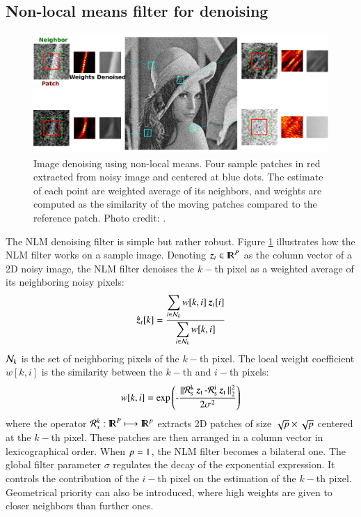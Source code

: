 \subsection{Non-local means filter for denoising}
\begin{figure}
	\centering
	\includegraphics[width=\columnwidth]{./images/NLM/lena.png}		
	\caption{\label{fig:lena} Image denoising using non-local means. Four sample patches in red extracted from noisy image and centered at blue dots. The estimate of each point are weighted average of its neighbors, and weights are computed as the similarity of the moving patches compared to the reference patch. Photo credit: \citet{foi2016foveated}.}
\end{figure}

The NLM denoising filter is simple but rather robust. Figure \ref{fig:lena} illustrates how the NLM filter works on a sample image. Denoting $ \operatorname{\boldsymbol{z}}_t \in {\rm I\!R}^{P} $ as the column vector of a 2D noisy image, the NLM filter denoises the $ k- $th pixel as a weighted average of its neighboring noisy pixels:
\begin{equation}
	\hat{\operatorname{\boldsymbol{z}}}_t[k]=\frac{\displaystyle \sum_{i\in\mathcal{N}_k}w[k,i]\operatorname{\boldsymbol{z}}_t[i]}{\displaystyle \sum_{i\in\mathcal{N}_k}w[k,i]}
\end{equation}
$ \mathcal{N}_k $ is the set of neighboring pixels of the $ k- $th pixel. The local weight coefficient $ w[k,i] $ is the similarity between the $ k- $th and $ i- $th pixels:
\begin{equation}
	w[k,i] = \operatorname{\exp{ \left( -\frac{\|\mathcal{R}_s^k\ensuremath{\operatorname{\boldsymbol{z}}}_t-\mathcal{R}_s^i\ensuremath{\operatorname{\boldsymbol{z}}}_t\|^2_2}{2\sigma^2}\right)}}
\end{equation}
where the operator $ \mathcal{R}_s^k: {\rm I\!R}^{P} \longmapsto {\rm I\!R}^p$ extracts 2D patches of size $ \sqrt{p}\times \sqrt{p} $ centered at the $ k- $th pixel. These patches are then arranged in a column vector in lexicographical order. When $ p=1 $, the NLM filter becomes a bilateral one. The global filter parameter $ \sigma $ regulates the decay of the exponential expression. It controls the contribution of the $ i- $th pixel on the estimation of the $ k- $th pixel. Geometrical priority can also be introduced, where high weights are given to closer neighbors than further ones.


